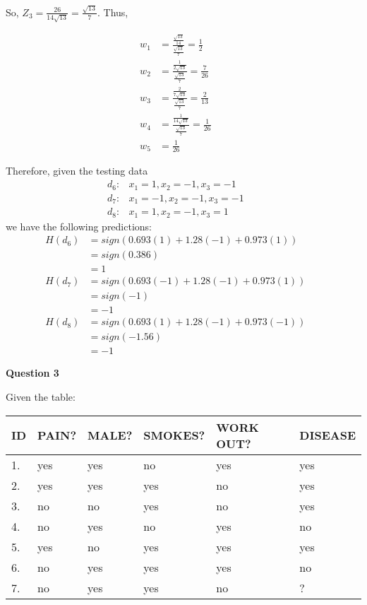 \documentclass[12pt]{article} %
\begin{document}
\begin{flushleft}
\begin{enumerate}
So, $Z_3 = \frac{26}{14\sqrt{13}} = \frac{\sqrt{13}}{7}$. Thus,

\begin{align*}
	w_1 &= \frac{\frac{\sqrt{13}}{14}}{\frac{\sqrt{13}}{7}} = \frac{1}{2}&&\\
	w_2 &= \frac{\frac{1}{2\sqrt{13}}}{\frac{\sqrt{13}}{7}} = \frac{7}{26}&&\\
	w_3 &= \frac{\frac{2}{7\sqrt{13}}}{\frac{\sqrt{13}}{7}} = \frac{2}{13}&&\\
	w_4 &= \frac{\frac{1}{14\sqrt{13}}}{\frac{\sqrt{13}}{7}} = \frac{1}{26}&&\\
	w_5 &= \frac{1}{26}
\end{align*}

Therefore, given the testing data
	\begin{align*}
		d_6: &x_1 = 1, x_2 = -1, x_3 = -1&&\\
		d_7: &x_1 = -1, x_2 = -1, x_3 = -1&&\\
	   d_8: &x_1 = 1, x_2 = -1, x_3 = 1
	\end{align*}
	we have the following predictions:
\begin{align*}
	H(d_6) &= sign(0.693(1) + 1.28(-1) + 0.973(1)) &&\\
	&= sign(0.386) &&\\
	&= 1 &&\\
	H(d_7) &= sign(0.693(-1) + 1.28(-1) + 0.973(1)) &&\\
	&= sign(-1) &&\\
	&= -1&&\\
	H(d_8) &= sign(0.693(1) + 1.28(-1) + 0.973(-1)) &&\\
	&= sign(-1.56) &&\\
	&= -1
\end{align*}
\end{enumerate}

\vspace{0.5cm}

\textbf{Question 3}

Given the table:
\begin{center}
\begin{tabular}{|p{1.2cm} | p{1.2cm} p{1.2cm} p{2cm} p{1.2cm} | p{1.8cm}|}
		\hline
		ID & PAIN? & MALE? & SMOKES? & WORK OUT? & DISEASE \\
		\hline
		1. & yes & yes & no & yes & yes \\
		2. & yes & yes & yes & no & yes \\
		3. & no & no & yes & no & yes \\
		4. & no & yes & no & yes & no \\
		5. & yes & no & yes & yes & yes \\
		6. & no & yes & yes & yes & no \\
		7. & no & yes & yes & no & ? \\
		\hline
\end{tabular}
\end{center}\ \\


\end{flushleft}
\end{document}
